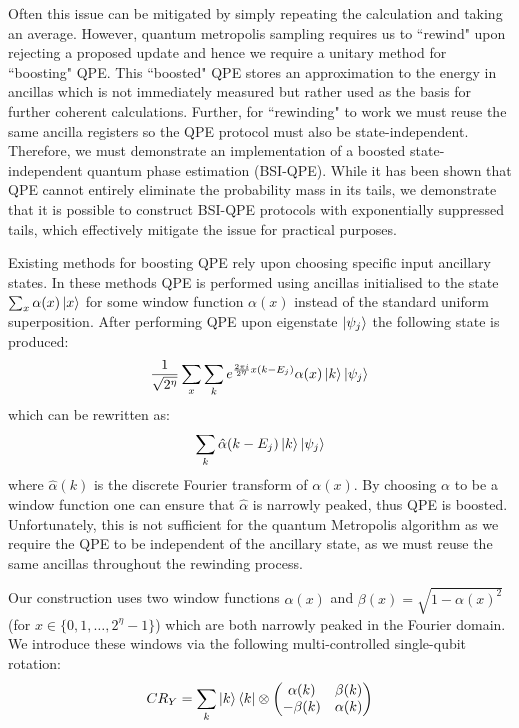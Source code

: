 \documentclass[aps,floatfix,10pt,amssymb,amsfont,amsmath,superscriptaddress,float,nofootinbib,longbibliography,nobalancelastpage,twocolumn]{revtex4-2}
\begin{document}
Often this issue can be mitigated by simply repeating the calculation and taking an average. However, quantum metropolis sampling requires us to ``rewind" upon rejecting a proposed update and hence we require a unitary method for ``boosting" QPE. This ``boosted" QPE stores an approximation to the energy in ancillas which is not immediately measured but rather used as the basis for further coherent calculations. Further, for ``rewinding" to work we must reuse the same ancilla registers so the QPE protocol must also be state-independent. Therefore, we must demonstrate an implementation of a boosted state-independent quantum phase estimation (BSI-QPE). While it has been shown \cite{chen2023quantumthermalstatepreparation} that QPE cannot entirely eliminate the probability mass in its tails, we demonstrate that it is possible to construct BSI-QPE protocols with exponentially suppressed tails, which effectively mitigate the issue for practical purposes. 

Existing methods for boosting QPE rely upon choosing specific input ancillary states. In these methods QPE is performed using ancillas initialised to the state $\sum_x \alpha(x) \ket{x}$ for some window function $\alpha(x)$ instead of the standard uniform superposition. After performing QPE upon eigenstate $\ket{\psi_j}$ the following state is produced:
\begin{equation}
   \frac{1}{\sqrt{2^{\eta}}} \sum_x \sum_k e^{\frac{2 \pi i}{2^{\eta}}x(k-E_j)} \alpha(x)\ket{k}\ket{\psi_j}
\end{equation}
which can be rewritten as:
\begin{equation}
    \sum_k \hat\alpha(k-E_j) \ket{k}\ket{\psi_j}
\end{equation}
where $\hat \alpha(k)$ is the discrete Fourier transform of $\alpha(x)$. By choosing $\alpha$ to be a window function one can ensure that $\hat \alpha$ is narrowly peaked, thus QPE is boosted. Unfortunately, this is not sufficient for the quantum Metropolis algorithm as we require the QPE to be independent of the ancillary state, as we must reuse the same ancillas throughout the rewinding process. 

Our construction uses two window functions $\alpha(x)$ and $\beta(x) = \sqrt{1-\alpha(x)^2}$ (for $x\in\{0,1,\ldots,2^{\eta}-1\}$) which are both narrowly peaked in the Fourier domain. We introduce these windows via the following multi-controlled single-qubit rotation:
\begin{equation}
   CR_Y = \sum_k \ket{k}\bra{k}\otimes \begin{pmatrix}
        \alpha(k)& \beta(k)\\
        -\beta(k)& \alpha(k)
    \end{pmatrix}
\end{equation}
\end{document}
